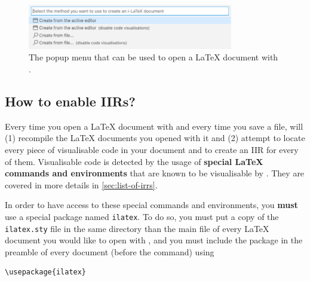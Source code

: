 \begin{figure}[h]
    \centering
    \includegraphics[width = 0.8\textwidth]{img/ilatex-menu.png}
    \caption{The popup menu that can be used to open a \LaTeX{} document with \iLaTeX{}.}
    \label{fig:open-with-ilatex-menu}
\end{figure}

\subsection{How to enable IIRs?}
\label{ssec:how-to-enable-iirs}
Every time you open a \LaTeX{} document with \iLaTeX{} and every time you save a file, \iLaTeX{} will (1) recompile the \LaTeX{} documents you opened with it and (2) attempt to locate every piece of visualisable code in your document and to create an IIR for every of them.
Visualisable code is detected by the usage of \textbf{special \LaTeX{} commands and environments} that are known to be visualisable by \iLaTeX{}.
They are covered in more details in \autoref{sec:list-of-irrs}.

In order to have access to these special commands and environments, you \textbf{must} use a special package named \texttt{ilatex}.
To do so, you must put a copy of the \texttt{ilatex.sty} file in the same directory than the main file of every \LaTeX{} document you would like to open with \iLaTeX{}, and you must include the package in the preamble of every document (\ie before the \verb|| command) using

\begin{lstlisting}[style=custom-latex]
\usepackage{ilatex}
\end{lstlisting}

